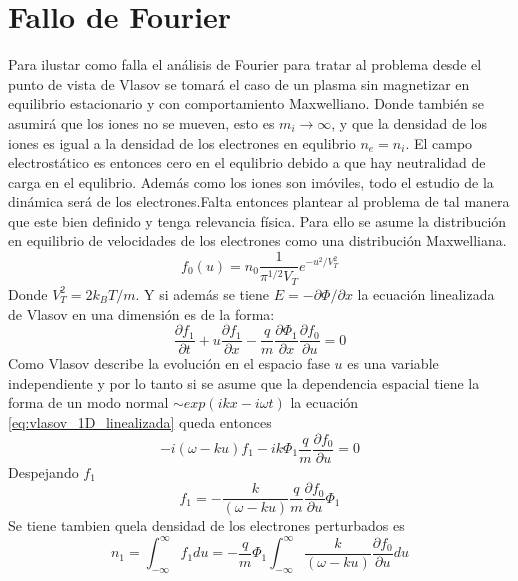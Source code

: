 \documentclass[../tesis_main_file.tex]{subfiles}
\begin{document}
\section{Fallo de Fourier}
Para ilustar como falla el análisis de Fourier para tratar al problema desde el punto de vista de Vlasov se tomará el caso de un plasma sin magnetizar en equilibrio estacionario y con comportamiento Maxwelliano. Donde también se asumirá que los iones no se mueven, esto es $m_i \to \infty$, y que la densidad de los iones es igual a la densidad de los electrones en equlibrio $n_e =n_i$. El campo electrostático es entonces cero en el equlibrio debido a que hay neutralidad de carga en el equlibrio. Además como los iones son imóviles, todo el estudio de la dinámica será de los electrones.Falta entonces plantear al problema de tal manera que este bien definido y tenga relevancia física. Para ello se asume la distribución en equilibrio de velocidades de los electrones como una distribución Maxwelliana.
\begin{equation}
\label{eq:fourier_distribucion_maxwelliana}
f_0(u)=n_0\frac{1}{\pi^{1/2}V_T}e^{-u^2/V_T^2}
\end{equation}
Donde $V_T^2=2k_BT/m$. Y si además se tiene $E=- \partial \Phi/\partial x$ la ecuación linealizada de Vlasov en una dimensión es de la forma:
\begin{equation}
\label{eq:vlasov_1D_linealizada}
\frac{\partial f_1}{\partial t}+u\frac{\partial f_1}{\partial x}-\frac{q}{m}\frac{\partial \Phi _1}{\partial x}\frac{\partial f_0}{\partial u}=0
\end{equation}
Como Vlasov describe la evolución en el espacio fase $u$ es una variable independiente y por lo tanto si se asume que la dependencia espacial tiene la forma de un modo normal $\sim exp(ikx-i\omega t)$ la ecuación \ref{eq:vlasov_1D_linealizada} queda entonces
\begin{equation}
-i(\omega-ku)f_1- ik\Phi _1 \frac{q}{m}\frac{\partial f_0}{\partial u}=0
\end{equation}
Despejando $f_1$
\begin{equation}
f_1 =-\frac{k}{(\omega -ku)}\frac{q}{m}\frac{\partial f_0}{\partial u}\Phi_1
\end{equation}
Se tiene tambien quela densidad de los electrones perturbados es
\begin{equation}
\label{eq:densidad_electrones_perturbados}
n_1 = \int^{\infty}_{-\infty} f_1 du=-\frac{q}{m}\Phi_1 \int^{\infty}_{-\infty}\frac{k}{(\omega-ku)}\frac{\partial f_0}{\partial u}du
\end{equation}
\end{document}
